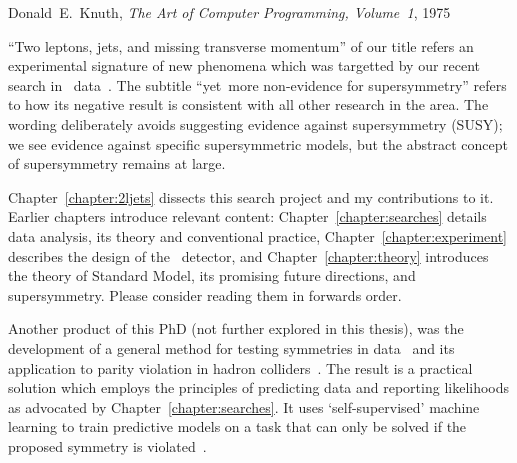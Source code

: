 \begin{preface}
\begin{singlespacing}
\begin{epigraphs}
%
{Donald~E.~Knuth,
\textit{The Art of Computer Programming, Volume~1},
1975~\cite{knuth1975art}}
\end{epigraphs}
\end{singlespacing}
\noindent
``Two leptons, jets, and missing transverse momentum'' of our title
refers an experimental signature of new phenomena which was targetted by our
recent search in \atlas\ data~\cite{atlas2022searches}.
The subtitle ``yet~more non-evidence for supersymmetry'' refers to how its
negative result is consistent with all other research in the area.
The wording deliberately avoids suggesting evidence against supersymmetry
(SUSY);
we see evidence against specific supersymmetric models, but the abstract
concept of supersymmetry remains at large.

Chapter~\ref{chapter:2ljets} dissects this search project and my contributions
to it.
Earlier chapters introduce relevant content:
Chapter~\ref{chapter:searches} details data analysis,
its theory and conventional practice,
Chapter~\ref{chapter:experiment} describes the design of the \atlas\ detector,
and
Chapter~\ref{chapter:theory} introduces the theory of Standard Model, its
promising future directions, and supersymmetry.
Please consider reading them in forwards order.

Another product of this PhD (not further explored in this thesis),
was the development of a general method for testing symmetries in data~\cite{
lester2021stressed,
tombs2021which
}
and its application to parity violation in hadron colliders~\cite{
lester2022hunting,
Lester:2019bso,
lesterChiralMeasurements2021,
Gripaios:2020hya,
lester2021lorentz
}.
The result is a practical solution which employs the principles of predicting
data and reporting likelihoods as advocated by Chapter~\ref{chapter:searches}.
It uses `self-supervised' machine learning to train predictive models on a
task that can only be solved if the proposed symmetry is violated~\cite{
tombs2021which,
pmlr-v139-radford21a,
Noroozi2016jigsaw,
multitaskself2017,
devlin2019bert
}.
\end{preface}

\tableofcontents

\thispagestyle{empty}
